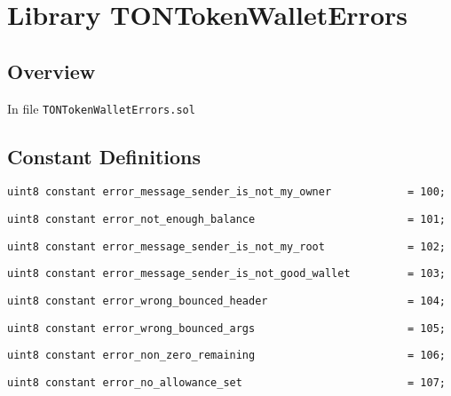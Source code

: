 
\chapter{Library TONTokenWalletErrors}

\minitoc

\section{Overview}


In file {\tt TONTokenWalletErrors.sol}

\section{Constant Definitions}


\begin{lstlisting}[firstnumber=4]
    uint8 constant error_message_sender_is_not_my_owner            = 100;
\end{lstlisting}

\begin{lstlisting}[firstnumber=5]
    uint8 constant error_not_enough_balance                        = 101;
\end{lstlisting}

\begin{lstlisting}[firstnumber=6]
    uint8 constant error_message_sender_is_not_my_root             = 102;
\end{lstlisting}

\begin{lstlisting}[firstnumber=7]
    uint8 constant error_message_sender_is_not_good_wallet         = 103;
\end{lstlisting}

\begin{lstlisting}[firstnumber=8]
    uint8 constant error_wrong_bounced_header                      = 104;
\end{lstlisting}

\begin{lstlisting}[firstnumber=9]
    uint8 constant error_wrong_bounced_args                        = 105;
\end{lstlisting}

\begin{lstlisting}[firstnumber=10]
    uint8 constant error_non_zero_remaining                        = 106;
\end{lstlisting}

\begin{lstlisting}[firstnumber=11]
    uint8 constant error_no_allowance_set                          = 107;
\end{lstlisting}

